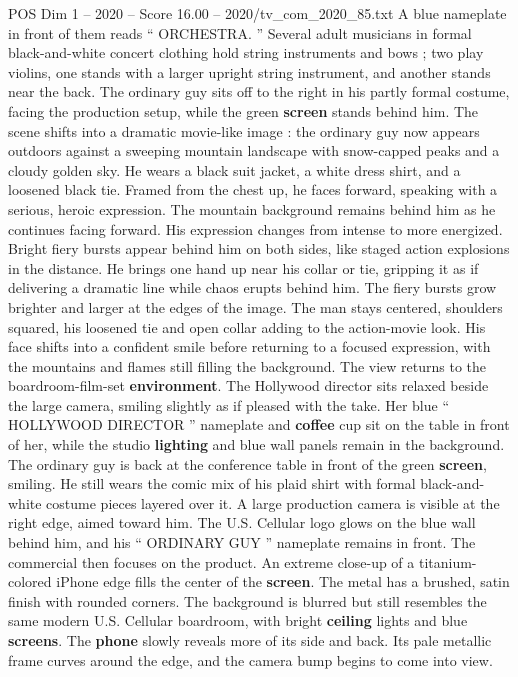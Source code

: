 \begin{textsample}{POS Dim 1 – 2020 – Score 16.00 – 2020/tv\_com\_2020\_85.txt}
A blue nameplate in front of them reads “ ORCHESTRA. ” Several adult musicians in formal black-and-white concert clothing hold string instruments and bows ; two play violins, one stands with a larger upright string instrument, and another stands near the back.
The ordinary guy sits off to the right in his partly formal costume, facing the production setup, while the green \textbf{screen} stands behind him.
The scene shifts into a dramatic movie-like image : the ordinary guy now appears outdoors against a sweeping mountain landscape with snow-capped peaks and a cloudy golden sky.
He wears a black suit jacket, a white dress shirt, and a loosened black tie.
Framed from the chest up, he faces forward, speaking with a serious, heroic expression.
The mountain background remains behind him as he continues facing forward.
His expression changes from intense to more energized.
Bright fiery bursts appear behind him on both sides, like staged action explosions in the distance.
He brings one hand up near his collar or tie, gripping it as if delivering a dramatic line while chaos erupts behind him.
The fiery bursts grow brighter and larger at the edges of the image.
The man stays centered, shoulders squared, his loosened tie and open collar adding to the action-movie look.
His face shifts into a confident smile before returning to a focused expression, with the mountains and flames still filling the background.
The view returns to the boardroom-film-set \textbf{environment}.
The Hollywood director sits relaxed beside the large camera, smiling slightly as if pleased with the take.
Her blue “ HOLLYWOOD DIRECTOR ” nameplate and \textbf{coffee} cup sit on the table in front of her, while the studio \textbf{lighting} and blue wall panels remain in the background.
The ordinary guy is back at the conference table in front of the green \textbf{screen}, smiling.
He still wears the comic mix of his plaid shirt with formal black-and-white costume pieces layered over it.
A large production camera is visible at the right edge, aimed toward him.
The U.S.
Cellular logo glows on the blue wall behind him, and his “ ORDINARY GUY ” nameplate remains in front.
The commercial then focuses on the product.
An extreme close-up of a titanium-colored iPhone edge fills the center of the \textbf{screen}.
The metal has a brushed, satin finish with rounded corners.
The background is blurred but still resembles the same modern U.S.
Cellular boardroom, with bright \textbf{ceiling} lights and blue \textbf{screens}.
The \textbf{phone} slowly reveals more of its side and back.
Its pale metallic frame curves around the edge, and the camera bump begins to come into view.

\end{textsample}
